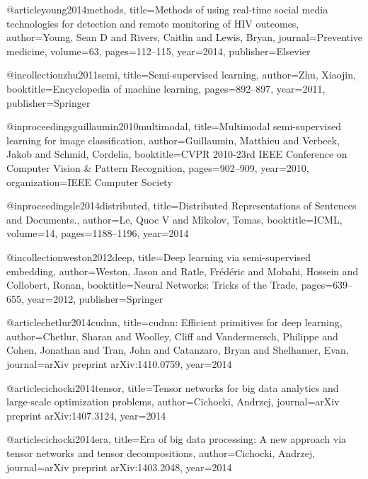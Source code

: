 @article{young2014methods,
  title={Methods of using real-time social media technologies for detection and remote monitoring of HIV outcomes},
  author={Young, Sean D and Rivers, Caitlin and Lewis, Bryan},
  journal={Preventive medicine},
  volume={63},
  pages={112--115},
  year={2014},
  publisher={Elsevier}
}


@incollection{zhu2011semi,
  title={Semi-supervised learning},
  author={Zhu, Xiaojin},
  booktitle={Encyclopedia of machine learning},
  pages={892--897},
  year={2011},
  publisher={Springer}
}

@inproceedings{guillaumin2010multimodal,
  title={Multimodal semi-supervised learning for image classification},
  author={Guillaumin, Matthieu and Verbeek, Jakob and Schmid, Cordelia},
  booktitle={CVPR 2010-23rd IEEE Conference on Computer Vision \& Pattern Recognition},
  pages={902--909},
  year={2010},
  organization={IEEE Computer Society}
}

@inproceedings{le2014distributed,
  title={Distributed Representations of Sentences and Documents.},
  author={Le, Quoc V and Mikolov, Tomas},
  booktitle={ICML},
  volume={14},
  pages={1188--1196},
  year={2014}
}

@incollection{weston2012deep,
  title={Deep learning via semi-supervised embedding},
  author={Weston, Jason and Ratle, Fr{\'e}d{\'e}ric and Mobahi, Hossein and Collobert, Ronan},
  booktitle={Neural Networks: Tricks of the Trade},
  pages={639--655},
  year={2012},
  publisher={Springer}
}

@article{chetlur2014cudnn,
  title={cudnn: Efficient primitives for deep learning},
  author={Chetlur, Sharan and Woolley, Cliff and Vandermersch, Philippe and Cohen, Jonathan and Tran, John and Catanzaro, Bryan and Shelhamer, Evan},
  journal={arXiv preprint arXiv:1410.0759},
  year={2014}
}


@article{cichocki2014tensor,
  title={Tensor networks for big data analytics and large-scale optimization problems},
  author={Cichocki, Andrzej},
  journal={arXiv preprint arXiv:1407.3124},
  year={2014}
}

@article{cichocki2014era,
  title={Era of big data processing: A new approach via tensor networks and tensor decompositions},
  author={Cichocki, Andrzej},
  journal={arXiv preprint arXiv:1403.2048},
  year={2014}
}

